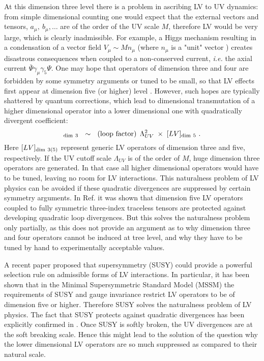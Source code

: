 \documentclass[12pt]{revtex4}
\begin{document}
At this dimension three level there is a problem in ascribing LV to UV
dynamics: from simple dimensional counting  one would expect that the
external vectors and tensors, $a_\mu,~b_\mu,\ldots$ are of the order
of the UV scale $M$, therefore LV would be very large, which is clearly
inadmissible. For example, a Higgs mechanism resulting in a
condensation of a vector field $V_{\mu}\sim M n_\mu$ (where $n_\mu$ is a 
"unit" vector \cite{Kostelecky:1989jw}) creates disastrous
consequences when coupled to a non-conserved current, 
{\em i.e.} the axial current $\bar \Psi \gamma_\mu\gamma_5 \Psi$.  
One may hope that operators of dimension three and four are forbidden by 
some symmetry arguments or tuned to be small, so that LV effects 
first appear at dimension five (or higher) level \cite{MP:}. 
However, such hopes are typically shattered by quantum corrections, which
lead to dimensional transmutation of a higher dimensional operator into
a lower dimensional one with quadratically divergent coefficient: 
%
\begin{equation}
[LV]_{\rm dim~3} ~~\sim~~ ({\rm loop~factor}) \, 
\;\Lambda_{UV}^2\;
\times\; [LV]_{{\rm dim}~5}~. 
\label{transmute}
\end{equation}
%
Here $[LV]_{\rm dim~3(5)}$ represent generic LV operators of dimension
three and five, respectively. If the UV cutoff scale $\Lambda_{UV}$ is
of the order of $M$, huge dimension three operators are generated. In
that case all higher dimensional operators would have to be tuned,
leaving no room for LV interactions. This naturalness problem of LV
physics can be avoided if these quadratic divergences are suppressed
by certain symmetry arguments. In Ref. \cite{MP:} it was shown that
dimension five LV operators coupled to fully symmetric three-index
traceless tensors are protected against developing quadratic loop 
divergences. But this solves the naturalness problem only partially, as
this does not provide an argument as to why dimension three and four
operators cannot be induced at tree level, and why they have to be
tuned by hand to experimentally acceptable values.  


A recent paper \cite{GrootNibbelink:2004za} proposed that
supersymmetry (SUSY) could provide a powerful selection rule on
admissible forms of LV interactions. In particular, it has been shown
that in the Minimal Supersymmetric Standard Model (MSSM) the
requirements of SUSY and gauge invariance restrict LV operators to be
of dimension five or higher. Therefore SUSY solves the naturalness
problem of LV physics. The fact that SUSY protects against quadratic
divergences has been explicitly confirmed in \cite{Jain:2005as}. 
Once SUSY is softly broken, the UV divergences are at the soft
breaking scale. Hence this might lead to the solution of the question
why the lower dimensional LV operators are so much suppressed as
compared to their natural scale. 
\end{document}
